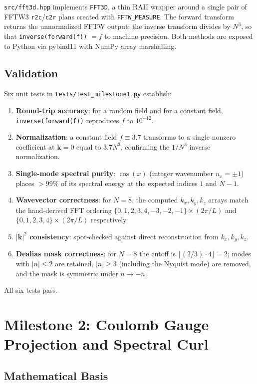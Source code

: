 \documentclass[11pt, a4paper]{article}
\begin{document}
\texttt{src/fft3d.hpp} implements \texttt{FFT3D}, a thin RAII wrapper
around a single pair of FFTW3 \texttt{r2c}/\texttt{c2r} plans created with
\texttt{FFTW\_MEASURE}. The forward transform returns the unnormalized
FFTW output; the inverse transform divides by $N^3$, so that
\texttt{inverse(forward(f))} $= f$ to machine precision. Both methods are
exposed to Python via pybind11 with NumPy array marshalling.

\subsection{Validation}

Six unit tests in \texttt{tests/test\_milestone1.py} establish:
\begin{enumerate}
    \item \textbf{Round-trip accuracy}: for a random field and for a
    constant field, \texttt{inverse(forward(f))} reproduces $f$ to
    $10^{-12}$.
    \item \textbf{Normalization}: a constant field $f \equiv 3.7$
    transforms to a single nonzero coefficient at $\mathbf{k}=0$ equal to
    $3.7 N^3$, confirming the $1/N^3$ inverse normalization.
    \item \textbf{Single-mode spectral purity}: $\cos(x)$ (integer
    wavenumber $n_x = \pm 1$) places $>99\%$ of its spectral energy at the
    expected indices $1$ and $N-1$.
    \item \textbf{Wavevector correctness}: for $N=8$, the computed $k_x,
    k_y, k_z$ arrays match the hand-derived FFT ordering
    $\{0,1,2,3,4,-3,-2,-1\} \times (2\pi/L)$ and $\{0,1,2,3,4\}\times
    (2\pi/L)$ respectively.
    \item \textbf{$|\mathbf{k}|^2$ consistency}: spot-checked against
    direct reconstruction from $k_x, k_y, k_z$.
    \item \textbf{Dealias mask correctness}: for $N=8$ the cutoff is
    $\lfloor (2/3)\cdot 4\rfloor = 2$; modes with $|n|\le 2$ are retained,
    $|n|\ge 3$ (including the Nyquist mode) are removed, and the mask is
    symmetric under $n \to -n$.
\end{enumerate}
All six tests pass.

\section{Milestone 2: Coulomb Gauge Projection and Spectral Curl}
\label{sec:milestone2}

\subsection{Mathematical Basis}
\end{document}
